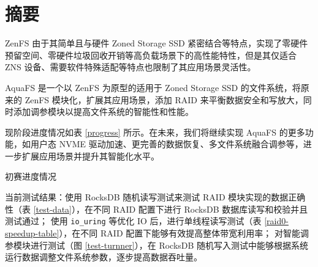 \section*{摘要}

ZenFS 由于其简单且与硬件 Zoned Storage SSD 紧密结合等特点，实现了零硬件预留空间、零硬件垃圾回收开销等高负载场景下的高性能特性，但是其仅适合 ZNS 设备、需要软件特殊适配等特点也限制了其应用场景灵活性。

AquaFS 是一个以 ZenFS 为原型的适用于 Zoned Storage SSD 的文件系统，将原来的 ZenFS 模块化，扩展其应用场景，添加 RAID 来平衡数据安全和写放大，同时添加调参模块以提高文件系统的智能性和性能。

现阶段进度情况如表 \ref{progress} 所示。在未来，我们将继续实现 AquaFS 的更多功能，如用户态 NVME 驱动加速、更完善的数据恢复、多文件系统融合调参等，进一步扩展应用场景并提升其智能化水平。

\begin{table}[htbp]
  \centering
  \caption{初赛进度情况}
  \label{progress}
  
\end{table}

当前测试结果：使用 RocksDB 随机读写测试来测试 RAID 模块实现的数据正确性（表 \ref{test-data}），在不同 RAID 配置下进行 RocksDB 数据库读写和校验并且测试通过；
使用 \verb|io_uring| 等优化 IO 后，进行单线程读写测试（表 \ref{raid0-speedup-table}），在不同 RAID 配置下能够有效提高整体带宽利用率；
对智能调参模块进行测试（图 \ref{test-turnner}），在 RocksDB 随机写入测试中能够根据系统运行数据调整文件系统参数，逐步提高数据吞吐量。